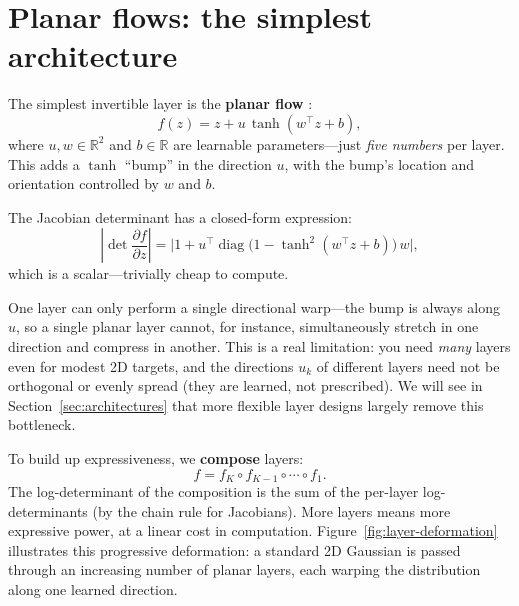 \documentclass[11pt,letterpaper]{article}
\begin{document}
\section{Planar flows: the simplest architecture}
\label{sec:planar}

The simplest invertible layer is the \textbf{planar flow}
\cite{rezende2015}:
\begin{equation}
  f(z) = z + u\,\tanh(w^\top z + b),
  \label{eq:planar}
\end{equation}
where $u, w \in \mathbb{R}^2$ and $b \in \mathbb{R}$ are learnable
parameters---just \emph{five numbers} per layer.
This adds a $\tanh$ ``bump'' in the direction $u$, with the bump's
location and orientation controlled by $w$ and $b$.

The Jacobian determinant has a closed-form expression:
\begin{equation}
  \left|\det \frac{\partial f}{\partial z}\right|
  = \bigl|1 + u^\top \operatorname{diag}\!\bigl(1 - \tanh^2(w^\top z + b)\bigr)\,w\bigr|,
  \label{eq:planar-det}
\end{equation}
which is a scalar---trivially cheap to compute.

One layer can only perform a single directional warp---the bump is
always along $u$, so a single planar layer cannot, for instance,
simultaneously stretch in one direction and compress in another.
This is a real limitation: you need \emph{many} layers even
for modest 2D targets, and the directions $u_k$ of different layers
need not be orthogonal or evenly spread (they are learned, not
prescribed).
We will see in Section~\ref{sec:architectures} that more flexible
layer designs largely remove this bottleneck.

To build up expressiveness, we \textbf{compose} layers:
\begin{equation}
  f = f_K \circ f_{K-1} \circ \cdots \circ f_1.
  \label{eq:composition}
\end{equation}
The log-determinant of the composition is the sum of the per-layer
log-determinants (by the chain rule for Jacobians).
More layers means more expressive power, at a linear cost in computation.
Figure~\ref{fig:layer-deformation} illustrates this progressive
deformation: a standard 2D Gaussian is passed through an increasing
number of planar layers, each warping the distribution along one
learned direction.
\end{document}

